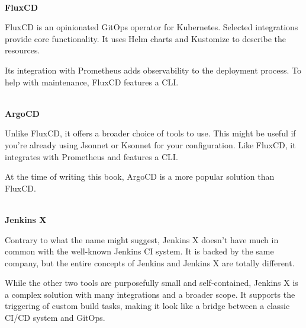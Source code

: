 \hspace*{\fill} \\ %
\noindent
\textbf{FluxCD}

FluxCD is an opinionated GitOps operator for Kubernetes. Selected integrations provide core functionality. It uses Helm charts and Kustomize to describe the resources.

Its integration with Prometheus adds observability to the deployment process. To help with maintenance, FluxCD features a CLI.

\hspace*{\fill} \\ %
\noindent
\textbf{ArgoCD}

Unlike FluxCD, it offers a broader choice of tools to use. This might be useful if you're already using Jsonnet or Ksonnet for your configuration. Like FluxCD, it integrates with Prometheus and features a CLI.

At the time of writing this book, ArgoCD is a more popular solution than FluxCD.

\hspace*{\fill} \\ %
\noindent
\textbf{Jenkins X}

Contrary to what the name might suggest, Jenkins X doesn't have much in common with the well-known Jenkins CI system. It is backed by the same company, but the entire concepts of Jenkins and Jenkins X are totally different.

While the other two tools are purposefully small and self-contained, Jenkins X is a complex solution with many integrations and a broader scope. It supports the triggering of custom build tasks, making it look like a bridge between a classic CI/CD system and GitOps.








